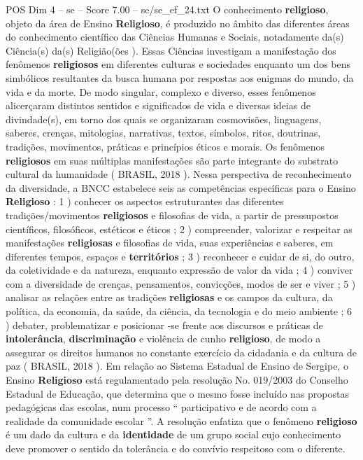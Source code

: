 \begin{textsample}{POS Dim 4 – se – Score 7.00 – se/se\_ef\_24.txt}
O conhecimento \textbf{religioso}, objeto da área de Ensino \textbf{Religioso}, é produzido no âmbito das diferentes áreas do conhecimento científico das Ciências Humanas e Sociais, notadamente da(s) Ciência(s) da(s) Religião(ões ).
Essas Ciências investigam a manifestação dos fenômenos \textbf{religiosos} em diferentes culturas e sociedades enquanto um dos bens simbólicos resultantes da busca humana por respostas aos enigmas do mundo, da vida e da morte.
De modo singular, complexo e diverso, esses fenômenos alicerçaram distintos sentidos e significados de vida e diversas ideias de divindade(s), em torno dos quais se organizaram cosmovisões, linguagens, saberes, crenças, mitologias, narrativas, textos, símbolos, ritos, doutrinas, tradições, movimentos, práticas e princípios éticos e morais.
Os fenômenos \textbf{religiosos} em suas múltiplas manifestações são parte integrante do substrato cultural da humanidade ( BRASIL, 2018 ).
Nessa perspectiva de reconhecimento da diversidade, a BNCC estabelece seis as competências específicas para o Ensino \textbf{Religioso} : 1 ) conhecer os aspectos estruturantes das diferentes tradições/movimentos \textbf{religiosos} e filosofias de vida, a partir de pressupostos científicos, filosóficos, estéticos e éticos ; 2 ) compreender, valorizar e respeitar as manifestações \textbf{religiosas} e filosofias de vida, suas experiências e saberes, em diferentes tempos, espaços e \textbf{territórios} ; 3 ) reconhecer e cuidar de si, do outro, da coletividade e da natureza, enquanto expressão de valor da vida ; 4 ) conviver com a diversidade de crenças, pensamentos, convicções, modos de ser e viver ; 5 ) analisar as relações entre as tradições \textbf{religiosas} e os campos da cultura, da política, da economia, da saúde, da ciência, da tecnologia e do meio ambiente ; 6 ) debater, problematizar e posicionar -se frente aos discursos e práticas de \textbf{intolerância}, \textbf{discriminação} e violência de cunho \textbf{religioso}, de modo a assegurar os direitos humanos no constante exercício da cidadania e da cultura de paz ( BRASIL, 2018 ).
Em relação ao Sistema Estadual de Ensino de Sergipe, o Ensino \textbf{Religioso} está regulamentado pela resolução No. 019/2003 do Conselho Estadual de Educação, que determina que o mesmo fosse incluído nas propostas pedagógicas das escolas, num processo “ participativo e de acordo com a realidade da comunidade escolar ”.
A resolução enfatiza que o fenômeno \textbf{religioso} é um dado da cultura e da \textbf{identidade} de um grupo social cujo conhecimento deve promover o sentido da tolerância e do convívio respeitoso com o diferente.

\end{textsample}
